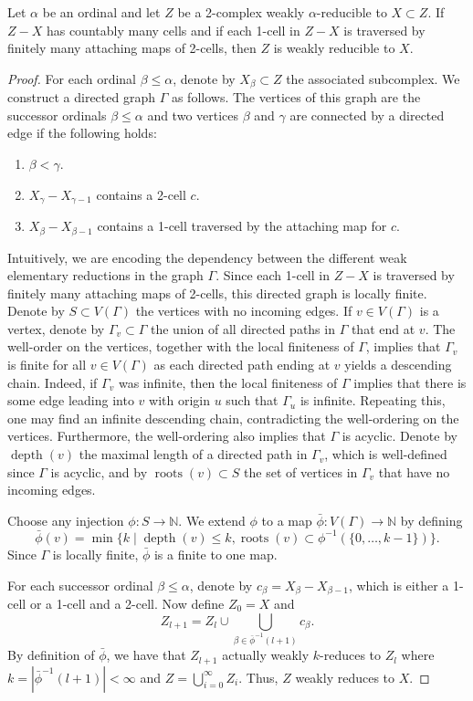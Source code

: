 \documentclass[10pt,a4paper]{amsart}
\DeclareMathOperator{\depth}{depth}
\DeclareMathOperator{\roots}{roots}
\newcommand{\N}{\mathbb{N}}
\begin{document}
\begin{lemma}
\label{reshuffle}
Let $\alpha$ be an ordinal and let $Z$ be a 2-complex weakly $\alpha$-reducible to $X\subset Z$. If $Z - X$ has countably many cells and if each 1-cell in $Z-X$ is traversed by finitely many attaching maps of 2-cells, then $Z$ is weakly reducible to $X$.
\end{lemma}

\begin{proof}
    For each ordinal $\beta\leqslant \alpha$, denote by $X_{\beta}\subset Z$ the associated subcomplex. We construct a directed graph $\Gamma$ as follows. The vertices of this graph are the successor ordinals $\beta\leqslant \alpha$ and two vertices $\beta$ and $\gamma$ are connected by a directed edge if the following holds:
    \begin{enumerate}
        \item $\beta<\gamma$.
        \item $X_{\gamma} - X_{\gamma -1}$ contains a 2-cell $c$.
        \item $X_{\beta} - X_{\beta-1}$ contains a 1-cell traversed by the attaching map for $c$.
    \end{enumerate} 
Intuitively, we are encoding the dependency between the different weak elementary reductions in the graph $\Gamma$. Since each 1-cell in $Z - X$ is traversed by finitely many attaching maps of 2-cells, this directed graph is locally finite. Denote by $S\subset V(\Gamma)$ the vertices with no incoming edges. If $v\in V(\Gamma)$ is a vertex, denote by $\Gamma_v\subset \Gamma$ the union of all directed paths in $\Gamma$ that end at $v$. The well-order on the vertices, together with the local finiteness of $\Gamma$, implies that $\Gamma_v$ is finite for all $v\in V(\Gamma)$ as each directed path ending at $v$ yields a descending chain. Indeed, if $\Gamma_v$ was infinite, then the local finiteness of $\Gamma$ implies that there is some edge leading into $v$ with origin $u$ such that $\Gamma_u$ is infinite. Repeating this, one may find an infinite descending chain, contradicting the well-ordering on the vertices. Furthermore, the well-ordering also implies that $\Gamma$ is acyclic. Denote by $\depth(v)$ the maximal length of a directed path in $\Gamma_v$, which is well-defined since $\Gamma$ is acyclic, and by $\roots(v)\subset S$ the set of vertices in $\Gamma_v$ that have no incoming edges.

    Choose any injection $\phi\colon S\to \N$. We extend $\phi$ to a map $\bar{\phi}\colon V(\Gamma)\to \N$ by defining 
    \[
    \bar{\phi}(v) = \min{\{k \mid \depth(v)\leqslant k, \roots(v)\subset \phi^{-1}(\{0, \ldots, k-1\})\}}.
    \]
    Since $\Gamma$ is locally finite, $\bar{\phi}$ is a finite to one map.

    For each successor ordinal $\beta\leqslant \alpha$, denote by $c_{\beta} = X_{\beta} - X_{\beta-1}$, which is either a 1-cell or a 1-cell and a 2-cell. Now define $Z_0 = X$ and
    \[
    Z_{l+1} = Z_l \cup \bigcup_{\beta\in \bar{\phi}^{-1}(l+1)}c_{\beta}.
    \]
    By definition of $\bar{\phi}$, we have that $Z_{l+1}$ actually weakly $k$-reduces to $Z_{l}$ where $k = |\bar{\phi}^{-1}(l+1)|<\infty$ and $Z = \bigcup_{i=0}^{\infty}Z_i$. Thus, $Z$ weakly reduces to $X$.
\end{proof}
\end{document}
